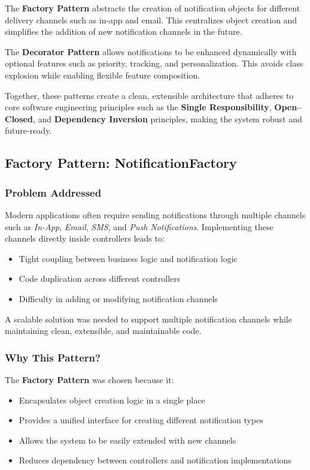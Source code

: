 \documentclass[a4paper,12pt]{report}
\begin{document}
The \textbf{Factory Pattern} abstracts the creation of notification objects for different delivery channels such as in-app and email. This centralizes object creation and simplifies the addition of new notification channels in the future.

The \textbf{Decorator Pattern} allows notifications to be enhanced dynamically with optional features such as priority, tracking, and personalization. This avoids class explosion while enabling flexible feature composition.

Together, these patterns create a clean, extensible architecture that adheres to core software engineering principles such as the \textbf{Single Responsibility}, \textbf{Open–Closed}, and \textbf{Dependency Inversion} principles, making the system robust and future-ready.

\subsection{Factory Pattern: NotificationFactory}

\subsubsection{Problem Addressed}
Modern applications often require sending notifications through multiple channels such as \textit{In-App}, \textit{Email}, \textit{SMS}, and \textit{Push Notifications}.  
Implementing these channels directly inside controllers leads to:
\begin{itemize}
    \item Tight coupling between business logic and notification logic
    \item Code duplication across different controllers
    \item Difficulty in adding or modifying notification channels
\end{itemize}

A scalable solution was needed to support multiple notification channels while maintaining clean, extensible, and maintainable code.

\subsubsection{Why This Pattern?}
The \textbf{Factory Pattern} was chosen because it:
\begin{itemize}
    \item Encapsulates object creation logic in a single place
    \item Provides a unified interface for creating different notification types
    \item Allows the system to be easily extended with new channels
    \item Reduces dependency between controllers and notification implementations
\end{itemize}
\end{document}
